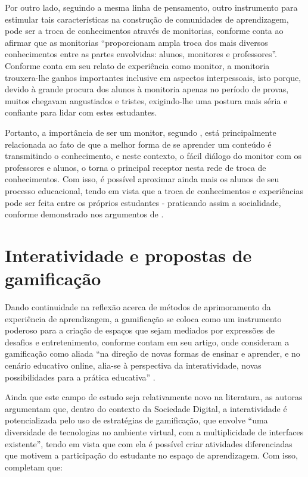 Por outro lado, seguindo a mesma linha de pensamento, outro instrumento para estimular tais características na construção de comunidades de aprendizagem, pode ser a troca de conhecimentos através de monitorias, conforme conta  ao afirmar que as monitorias ``proporcionam ampla troca dos mais diversos conhecimentos entre as partes envolvidas: alunos, monitores e professores''. 
Conforme  conta em seu relato de experiência como monitor, a monitoria trouxera-lhe ganhos importantes inclusive em aspectos interpessoais, isto porque, devido à grande procura dos alunos à monitoria apenas no período de provas, muitos chegavam angustiados e tristes, exigindo-lhe uma postura mais séria e confiante para lidar com estes estudantes.

Portanto, a importância de ser um monitor, segundo , está principalmente relacionada ao fato de que a melhor forma de se aprender um conteúdo é transmitindo o conhecimento, e neste contexto, o fácil diálogo do monitor com os professores e alunos, o torna o principal receptor nesta rede de troca de conhecimentos. Com isso, é possível aproximar ainda mais os alunos de seu processo educacional, tendo em vista que a troca de conhecimentos e experiências pode ser feita entre os próprios estudantes - praticando assim a socialidade, conforme demonstrado nos argumentos de .

\section{Interatividade e propostas de gamificação}
Dando continuidade na reflexão acerca de métodos de aprimoramento da experiência de aprendizagem, a gamificação se coloca como um instrumento poderoso para a criação de espaços que sejam mediados por expressões de desafios e entretenimento, conforme contam  em seu artigo, onde consideram a gamificação como aliada “na direção de novas formas de ensinar e aprender, e no cenário educativo online, alia-se à perspectiva da interatividade, novas possibilidades para a prática educativa” \cite{valentim2016interatividade}.

Ainda que este campo de estudo seja relativamente novo na literatura, as autoras argumentam que, dentro do contexto da Sociedade Digital, a interatividade é potencializada pelo uso de estratégias de gamificação, que envolve “uma diversidade de tecnologias no ambiente virtual, com a multiplicidade de interfaces existente”, tendo em vista que com ela é possível criar atividades diferenciadas que motivem a participação do estudante no espaço de aprendizagem. Com isso,  completam que:

